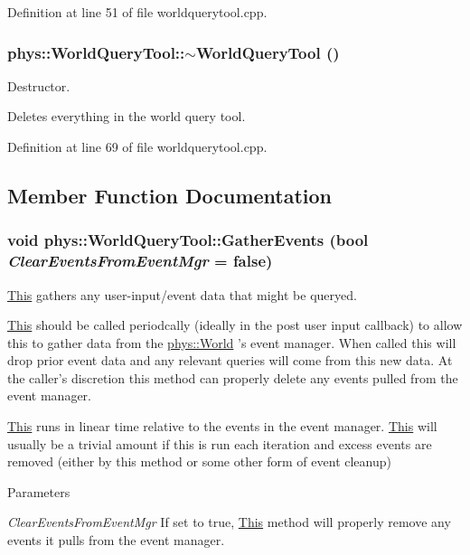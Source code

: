 Definition at line 51 of file worldquerytool.cpp.

\hypertarget{classphys_1_1WorldQueryTool_ace36ffebcabbbf0553c517820bc636c9}{
\subsubsection[{$\sim$WorldQueryTool}]{\setlength{\rightskip}{0pt plus 5cm}phys::WorldQueryTool::$\sim$WorldQueryTool ()}}
\label{d8/d69/classphys_1_1WorldQueryTool_ace36ffebcabbbf0553c517820bc636c9}


Destructor. 

Deletes everything in the world query tool. 

Definition at line 69 of file worldquerytool.cpp.



\subsection{Member Function Documentation}
\hypertarget{classphys_1_1WorldQueryTool_ae387ff047f3cdf408d8959b8cbf4cc57}{
\subsubsection[{GatherEvents}]{\setlength{\rightskip}{0pt plus 5cm}void phys::WorldQueryTool::GatherEvents (bool {\em ClearEventsFromEventMgr} = {\ttfamily false})}}
\label{d8/d69/classphys_1_1WorldQueryTool_ae387ff047f3cdf408d8959b8cbf4cc57}


\hyperlink{structThis}{This} gathers any user-\/input/event data that might be queryed. 

\hyperlink{structThis}{This} should be called periodcally (ideally in the post user input callback) to allow this to gather data from the \hyperlink{classphys_1_1World}{phys::World} 's event manager. When called this will drop prior event data and any relevant queries will come from this new data. At the caller's discretion this method can properly delete any events pulled from the event manager. \par
 \par
 \hyperlink{structThis}{This} runs in linear time relative to the events in the event manager. \hyperlink{structThis}{This} will usually be a trivial amount if this is run each iteration and excess events are removed (either by this method or some other form of event cleanup) 
\begin{DoxyParams}{Parameters}
\item[{\em ClearEventsFromEventMgr}]If set to true, \hyperlink{structThis}{This} method will properly remove any events it pulls from the event manager. \end{DoxyParams}


